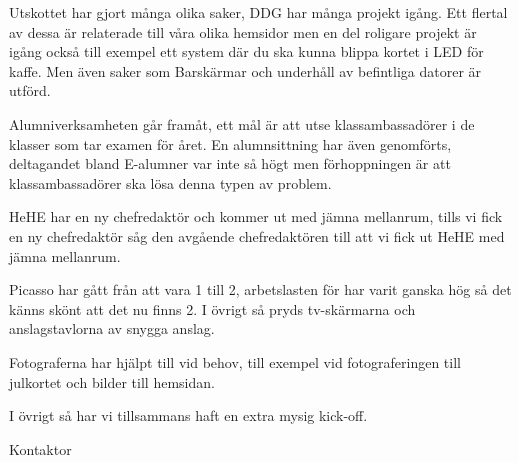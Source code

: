 \documentclass[../_main/handlingar.tex]{subfiles}
\begin{document}
Utskottet har gjort många olika saker, DDG har många projekt igång. Ett flertal av dessa är relaterade till våra olika hemsidor men en del roligare projekt är igång också till exempel ett system där du ska kunna blippa kortet i LED för kaffe. Men även saker som Barskärmar och underhåll av befintliga datorer är utförd.

Alumniverksamheten går framåt, ett mål är att utse klassambassadörer i de klasser som tar examen för året. En alumnsittning har även genomförts, deltagandet bland E-alumner var inte så högt men förhoppningen är att klassambassadörer ska lösa denna typen av problem.

HeHE har en ny chefredaktör och kommer ut med jämna mellanrum, tills vi fick en ny chefredaktör såg den avgående chefredaktören till att vi fick ut HeHE med jämna mellanrum.

Picasso har gått från att vara 1 till 2, arbetslasten för har varit ganska hög så det känns skönt att det nu finns 2. I övrigt så pryds tv-skärmarna och anslagstavlorna av snygga anslag.

Fotograferna har hjälpt till vid behov, till exempel vid fotograferingen till julkortet och bilder till hemsidan.

I övrigt så har vi tillsammans haft en extra mysig kick-off.
\begin{signatures}{1}
    \mvh
    \signature{Johan Karlberg}{Kontaktor}
\end{signatures}
\end{document}
